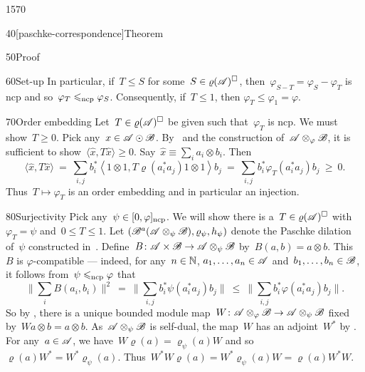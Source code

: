 \begin{parsec}{1570}
\begin{point}{40}[paschke-correspondence]{Theorem}
\begin{point}{50}{Proof}
\begin{point}{60}{Set-up}
In particular, if~$T \leq S$
    for some~$S \in \varrho(\mathscr{A})^\square$,
    then~$\varphi_{S-T} = \varphi_S - \varphi_T$ is ncp
    and so~$\varphi_T \mathrel{\leqslant_{\mathrm{ncp}}} \varphi_S$.
Consequently, if~$T\leq 1$, then $\varphi_T \leq \varphi_1 = \varphi$.
\end{point}
\begin{point}{70}{Order embedding}%
Let~$T \in \varrho(\mathscr{A})^\square$
    be given such that~$\varphi_T$ is ncp.
We must show~$T \geq 0$.
Pick any~$x \in \mathscr{A} \odot \mathscr{B}$.
By~ and
    the construction of~$\mathscr{A} \otimes_\varphi \mathscr{B}$,
    it is sufficient to show~$\langle \hat{x}, T \hat{x}\rangle \geq 0$.
Say~$\hat{x} \equiv \sum_i a_i \otimes b_i$.
Then
\begin{equation*}
    \langle\hat{x}, T \hat{x} \rangle
    \ =\  \sum_{i,j} b_i^* \left< 1\otimes 1, T \varrho(a_i^*a_j) 1 \otimes 1\right> b_j
    \ = \ \sum_{i,j} b_i^* \varphi_T (a_i^*a_j) b_j \ \geq\  0.
\end{equation*}
Thus~$T \mapsto \varphi_T$ is an order embedding
    and in particular an injection.
\end{point}
\begin{point}{80}{Surjectivity}%
Pick any~$\psi \in [0,\varphi]_{\mathrm{ncp}}$.
We will show there is a~$T \in \varrho(\mathscr{A})^\square$
    with~$\varphi_T = \psi$ and~$0 \leq T \leq 1$.
Let $(\mathscr{B}^a(\mathscr{A} \otimes_\psi \mathscr{B}),
    \varrho_\psi, h_\psi)$ denote the Paschke dilation of~$\psi$
    constructed in~.
Define~$B\colon \mathscr{A} \times \mathscr{B} \to \mathscr{A} \otimes_\psi \mathscr{B}$
    by~$B(a,b) = a \otimes b$.
This~$B$ is $\varphi$-compatible
--- indeed, for any~$n \in \mathbb{N}$, $a_1, \ldots, a_n \in \mathscr{A}$
    and~$b_1, \ldots, b_n \in \mathscr{B}$,
    it follows from~$\psi \mathrel{\leqslant_{\mathrm{ncp}}} \varphi$ that
\begin{equation*}
    \bigl\| \sum_i B(a_i, b_i) \bigr\|^2
     \ = \  \bigl\| \sum_{i,j}
                b_i^* \psi(a_i^*a_j) b_j \bigr\|
     \ \leq \  \bigl\| \sum_{i,j}
                b_i^* \varphi(a_i^*a_j) b_j \bigr\|.
\end{equation*}
So by ,
    there is a unique bounded module
    map~$W \colon \mathscr{A} \otimes_\varphi \mathscr{B} \to \mathscr{A} \otimes_\psi \mathscr{B}$
    fixed by~$W a \otimes b = a \otimes b$.
As~$\mathscr{A} \otimes_\psi \mathscr{B}$ is self-dual,
    the map~$W$ has an adjoint~$W^*$ by .
For any~$a\in\mathscr{A}$, we have~$W \varrho(a) = \varrho_\psi(a) W$
and so~$\varrho(a) W^* = W^* \varrho_\psi(a)$.
Thus~$W^*W \varrho(a) = W^* \varrho_\psi(a) W = \varrho(a) W^*W$.

\end{point}
\end{point}
\end{point}
\end{parsec}
